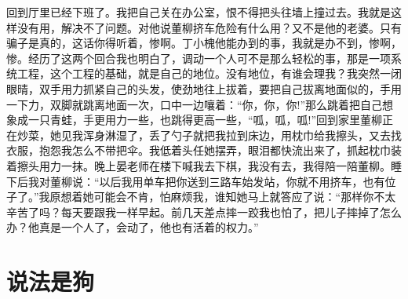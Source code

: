 \documentclass[12pt,oneside]{book}
\begin{document}
回到厅里已经下班了。我把自己关在办公室，恨不得把头往墙上撞过去。我就是这样没有用，解决不了问题。对他说董柳挤车危险有什么用？又不是他的老婆。只有骗子是真的，这话你得听着，惨啊。丁小槐他能办到的事，我就是办不到，惨啊，惨。经历了这两个回合我也明白了，调动一个人可不是那么轻松的事，那是一项系统工程，这个工程的基础，就是自己的地位。没有地位，有谁会理我？我突然一闭眼晴，双手用力抓紧自己的头发，使劲地往上拔着，要把自己拔离地面似的，手用一下力，双脚就跳离地面一次，口中一边嚷着：``你，你，你!''那么跳着把自己想象成一只青蛙，手更用力一些，也跳得更高一些，``呱，呱，呱!''回到家里董柳正在炒菜，她见我浑身淋湿了，丢了勺子就把我拉到床边，用枕巾给我擦头，又去找衣服，抱怨我怎么不带把伞。我低着头任她摆弄，眼泪都快流出来了，抓起枕巾装着擦头用力一抹。晚上晏老师在楼下喊我去下棋，我没有去，我得陪一陪董柳。睡下后我对董柳说：``以后我用单车把你送到三路车始发站，你就不用挤车，也有位子了。''我原想着她可能会不肯，怕麻烦我，谁知她马上就答应了说：``那样你不太辛苦了吗？每天要跟我一样早起。前几天差点摔一跤我也怕了，把儿子摔掉了怎么办？他真是一个人了，会动了，他也有活着的权力。''


\chapter{说法是狗}
\end{document}
